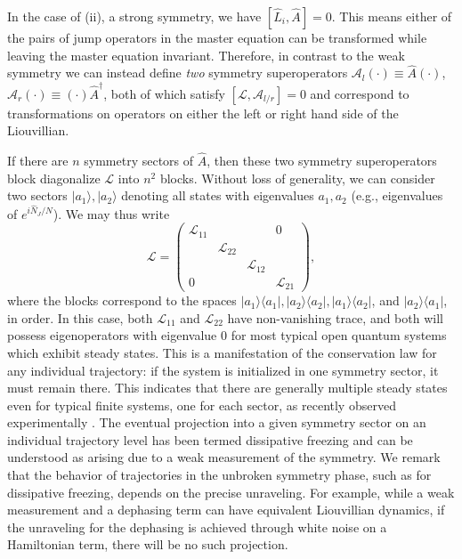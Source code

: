 \documentclass[11pt]{article}
\begin{document}
In the case of (ii), a strong symmetry, we have $[\hat L_i, \hat A] = 0$. This means either of the pairs of jump operators in the master equation can be transformed while leaving the master equation invariant. Therefore, in contrast to the weak symmetry we can instead define \textit{two} symmetry superoperators $\mathcal{A}_l(\cdot) \equiv \hat A(\cdot)$, $\mathcal{A}_r (\cdot) \equiv (\cdot) \hat A^\dagger$, both of which satisfy $[\mathcal{L}, \mathcal{A}_{l/r}] = 0$ and correspond to transformations on operators on either the left or right hand side of the Liouvillian.

If there are $n$ symmetry sectors of $\hat A$, then these two symmetry superoperators block diagonalize $\mathcal{L}$ into $n^2$ blocks. Without loss of generality, we can consider two sectors $|a_1\rangle, |a_2\rangle$ denoting all states with eigenvalues $a_1, a_2$ (e.g., eigenvalues of $e^{i \hat N_J/N}$). We may thus write 
\begin{equation}
    \mathcal{L} = \left(
    \begin{array}{cccc}
    \mathcal{L}_{11} &  &  & 0 \\
     & \mathcal{L}_{22} &  &  \\
     &  &\mathcal{L}_{12} &   \\
    0 &  &  & \mathcal{L}_{21}
    \end{array}
    \right),
\end{equation}
where the blocks correspond to the spaces $|a_1\rangle \langle a_1|,|a_2\rangle \langle a_2|,|a_1\rangle \langle a_2|$, and $|a_2\rangle \langle a_1|$, in order. In this case, both $\mathcal{L}_{11}$ and $\mathcal{L}_{22}$ have non-vanishing trace, and both will possess eigenoperators with eigenvalue 0 for most typical open quantum systems which exhibit steady states. This is a manifestation of the conservation law for any individual trajectory: if the system is initialized in one symmetry sector, it must remain there. This indicates that there are generally multiple steady states even for typical finite systems, one for each sector, as recently observed experimentally \cite{Li2023}. The eventual projection into a given symmetry sector on an individual trajectory level has been termed dissipative freezing \cite{SanchezMunoz2019} and can be understood as arising due to a weak measurement of the symmetry. We remark that the behavior of trajectories in the unbroken symmetry phase, such as for dissipative freezing, depends on the precise unraveling. For example, while a weak measurement and a dephasing term can have equivalent Liouvillian dynamics, if the unraveling for the dephasing is achieved through white noise on a Hamiltonian term, there will be no such projection. 
\end{document}
